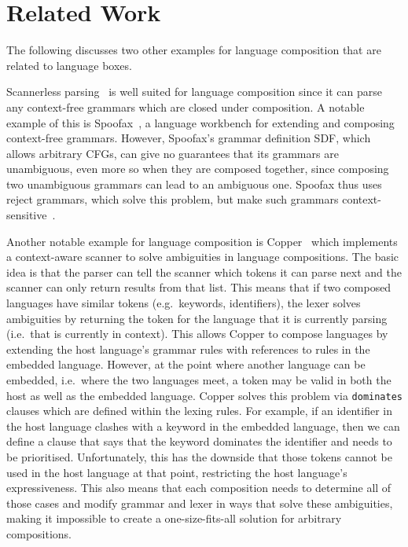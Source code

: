 \documentclass[sigplan,screen]{acmart}\settopmatter{printfolios=true,printccs=false,printacmref=false}
\begin{document}
\section{Related Work}
\label{autobox_related_work}

The following discusses two other examples for language composition that are
related to language boxes.

Scannerless parsing~\cite{visser97scannerless, vandenbrand02disambiguation} is well
suited for language composition since it can parse any context-free grammars
which are closed under composition. A notable example of this is
Spoofax~\cite{kats10spoofax}, a language workbench for extending and composing
context-free grammars. However, Spoofax's grammar definition SDF, which allows
arbitrary CFGs, can give no guarantees that its grammars are unambiguous, even
more so when they are composed together, since composing two unambiguous
grammars can lead to an ambiguous one.  Spoofax thus uses reject grammars,
which solve this problem, but make such grammars
context-sensitive~\cite{eijck__lets_accept_rejects}.

Another notable example for language composition is Copper~\cite{wyk07context}
which implements a context-aware scanner to solve ambiguities in language
compositions. The basic idea is that the parser can tell the scanner which
tokens it can parse next and the scanner can only return results from that
list.  This means that if two composed languages have similar tokens
(e.g.~keywords, identifiers), the lexer solves ambiguities by returning the
token for the language that it is currently parsing (i.e.~that is currently in
context). This allows Copper to compose languages by extending the host
language's grammar rules with references to rules in the embedded language.
However, at the point where another language can be embedded, i.e.~where the
two languages meet, a token may be valid in both the host as well as the
embedded language.  Copper solves this problem via \texttt{dominates} clauses
which are defined within the lexing rules. For example, if an identifier in the
host language clashes with a keyword in the embedded language, then we can
define a clause that says that the keyword dominates the identifier and needs
to be prioritised. Unfortunately, this has the downside that those tokens
cannot be used in the host language at that point, restricting the host
language's expressiveness. This also means that each composition needs to
determine all of those cases and modify grammar and lexer in ways that solve
these ambiguities, making it impossible to create a one-size-fits-all solution
for arbitrary compositions.


\end{document}
